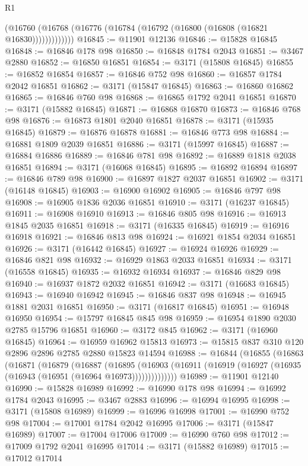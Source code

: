\begin{lexlean}{R1}
\begin{coremodule}
              (@16760 (@16768 (@16776 (@16784 (@16792 (@16800 (@16808 (@16821 @16830)))))))))))))
@16845 := @11901 @12136
@16846 := @15828 @16845
@16848 := @16846 @178 @98
@16850 := @16848 @1784 @2043
@16851 := @3467 @2880
@16852 := @16850 @16851
@16854 := @3171 (@15808 @16845)
@16855 := @16852 @16854
@16857 := @16846 @752 @98
@16860 := @16857 @1784 @2042 @16851
@16862 := @3171 (@15847 @16845)
@16863 := @16860 @16862
@16865 := @16846 @760 @98
@16868 := @16865 @1792 @2041 @16851
@16870 := @3171 (@15882 @16845)
@16871 := @16868 @16870
@16873 := @16846 @768 @98
@16876 := @16873 @1801 @2040 @16851
@16878 := @3171 (@15935 @16845)
@16879 := @16876 @16878
@16881 := @16846 @773 @98
@16884 := @16881 @1809 @2039 @16851
@16886 := @3171 (@15997 @16845)
@16887 := @16884 @16886
@16889 := @16846 @781 @98
@16892 := @16889 @1818 @2038 @16851
@16894 := @3171 (@16068 @16845)
@16895 := @16892 @16894
@16897 := @16846 @789 @98
@16900 := @16897 @1827 @2037 @16851
@16902 := @3171 (@16148 @16845)
@16903 := @16900 @16902
@16905 := @16846 @797 @98
@16908 := @16905 @1836 @2036 @16851
@16910 := @3171 (@16237 @16845)
@16911 := @16908 @16910
@16913 := @16846 @805 @98
@16916 := @16913 @1845 @2035 @16851
@16918 := @3171 (@16335 @16845)
@16919 := @16916 @16918
@16921 := @16846 @813 @98
@16924 := @16921 @1854 @2034 @16851
@16926 := @3171 (@16442 @16845)
@16927 := @16924 @16926
@16929 := @16846 @821 @98
@16932 := @16929 @1863 @2033 @16851
@16934 := @3171 (@16558 @16845)
@16935 := @16932 @16934
@16937 := @16846 @829 @98
@16940 := @16937 @1872 @2032 @16851
@16942 := @3171 (@16683 @16845)
@16943 := @16940 @16942
@16945 := @16846 @837 @98
@16948 := @16945 @1881 @2031 @16851
@16950 := @3171 (@16817 @16845)
@16951 := @16948 @16950
@16954 := @15797 @16845 @845 @98
@16959 := @16954 @1890 @2030 @2785 @15796 @16851
@16960 := @3172 @845
@16962 := @3171 (@16960 @16845)
@16964 := @16959 @16962 @15813
@16973 := @15815 @837 @310 @120 @2896 @2896 @2785 @2880 @15823 @14594
@16988 := @16844
    (@16855
      (@16863
        (@16871
          (@16879
            (@16887
              (@16895
                (@16903 (@16911 (@16919 (@16927 (@16935 (@16943 (@16951 (@16964 @16973))))))))))))))
@16989 := @11901 @12140
@16990 := @15828 @16989
@16992 := @16990 @178 @98
@16994 := @16992 @1784 @2043
@16995 := @3467 @2883
@16996 := @16994 @16995
@16998 := @3171 (@15808 @16989)
@16999 := @16996 @16998
@17001 := @16990 @752 @98
@17004 := @17001 @1784 @2042 @16995
@17006 := @3171 (@15847 @16989)
@17007 := @17004 @17006
@17009 := @16990 @760 @98
@17012 := @17009 @1792 @2041 @16995
@17014 := @3171 (@15882 @16989)
@17015 := @17012 @17014

\end{coremodule}
\end{lexlean}
